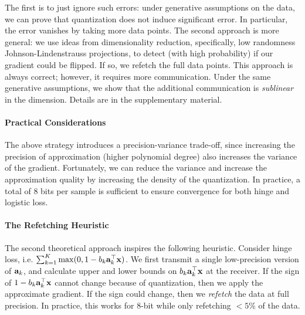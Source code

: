 \documentclass{article}
\def\a{{\bf a}}
\def\x{{\bf x}}
\begin{document}
The first is to just ignore such errors: under generative assumptions on the data, we can prove that quantization does not induce significant error. 
In particular, the error vanishes by taking more data points.
The second approach is more general: we use ideas from dimensionality reduction, specifically, low randomness Johnson-Lindenstrauss projections, to detect (with high probability) if our gradient could be flipped. If so, we refetch the full data points. 
This approach is always correct; however, it requires more communication.
Under the same generative assumptions, we show that the additional communication is \emph{sublinear} in the dimension.
Details are in the supplementary material.

\vspace{-0.5em}
\paragraph{Practical Considerations} The above strategy introduces a precision-variance trade-off, since increasing the precision of approximation (higher polynomial degree) also increases the variance of the gradient. 
Fortunately, we can reduce the variance and increase the approximation quality by increasing the density of the quantization. 
In practice, a total of $8$ bits per sample is sufficient to ensure convergence for both hinge and logistic loss. 

\vspace{-0.5em}
\paragraph*{The Refetching Heuristic}
The second theoretical approach inspires the following heuristic. 
Consider hinge loss, i.e.  $\sum_{k=1}^K \max(0, 1 - b_k \a_k^\top \x)$. 
We first transmit a single low-precision version of $\a_k$, and   
calculate upper and lower bounds on $b_k \a_k^\top \x$ at the receiver.
If the sign of $1-b_k \a_k^\top \x$ cannot change because of quantization, then we apply the approximate gradient. 
If the sign could change, then we {\em refetch} the data at full precision.
In practice, this works for 
8-bit while only refetching $<5\%$ of the data.
\end{document}
